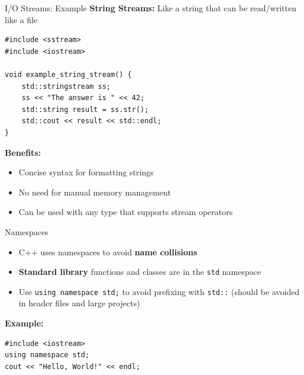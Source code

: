 \begin{frame}[fragile]{I/O Streams: Example}
	\textbf{String Streams:} Like a string that can be read/written like a file
	\begin{verbatim}
#include <sstream>
#include <iostream>

void example_string_stream() {
    std::stringstream ss;
    ss << "The answer is " << 42;
    std::string result = ss.str();
    std::cout << result << std::endl;
}
    \end{verbatim}

	\textbf{Benefits:}
	\begin{itemize}
		\item Concise syntax for formatting strings
		\item No need for manual memory management
		\item Can be used with any type that supports stream operators
	\end{itemize}
\end{frame}

\begin{frame}[fragile]{Namespaces}
	\begin{itemize}
		\item C++ uses namespaces to avoid \textbf{name collisions}
		\item \textbf{Standard library} functions and classes are in the \texttt{std} namespace
		\item Use \texttt{using namespace std;} to avoid prefixing with \texttt{std::} (should be avoided in header files and large projects)
	\end{itemize}
	\textbf{Example:}
	\begin{verbatim}
#include <iostream>
using namespace std;
cout << "Hello, World!" << endl;
        \end{verbatim}
\end{frame}

